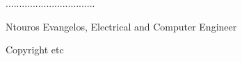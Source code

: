 
\vspace{20mm}

.................................

Ntouros Evangelos, Electrical and Computer Engineer

\vspace{20mm}

Copyright etc